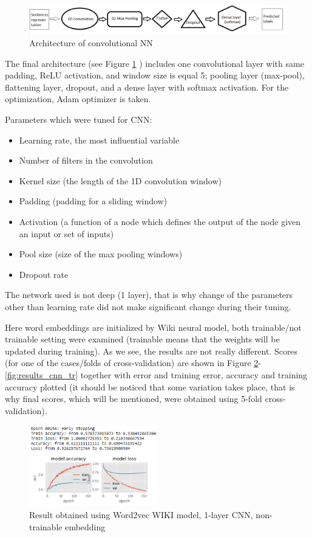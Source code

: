 \documentclass[12pt,a4paper]{article}
\begin{document}
\begin{figure}
\centering
\includegraphics[width=1\textwidth]{figures/cnn_arch.PNG}
\caption{Architecture of convolutional NN}
\label{fig:cnn_arch}
\end{figure}

The final architecture (see Figure \ref{fig:cnn_arch} ) includes one convolutional layer with same padding, ReLU activation, and window size is equal 5; pooling layer (max-pool), flattening layer, dropout, and a dense layer with softmax activation. For the optimization, Adam optimizer is taken. 

Parameters which were tuned for CNN:
\begin{itemize}
\item Learning rate, the most influential variable 
\item Number of filters in the convolution
\item Kernel size (the length of the 1D convolution window)
\item Padding (padding for a sliding window)
\item Activation (a function of a node which defines the output of the node given an input or set of inputs)
\item Pool size (size of the max pooling windows)
\item Dropout rate
\end{itemize}

The network used is not deep (1 layer), that is why change of the parameters other than learning rate did not make significant change during their tuning.

Here word embeddings are initialized by Wiki neural model, both trainable/not trainable setting were examined (trainable means that the weights will be updated during training). As we see, the results are not really different. Scores (for one of the cases/folds of cross-validation) are shown in Figure \ref{fig:results_cnn_nottr}-\ref{fig:results_cnn_tr} together with error and training error, accuracy and training accuracy plotted (it should be noticed that some variation takes place, that is why final scores, which will be mentioned, were obtained using 5-fold cross-validation).

\begin{figure}
\centering
\includegraphics[width=0.5\textwidth]{figures/results_cnn_nottr.PNG}
\caption{Result obtained using Word2vec WIKI model, 1-layer CNN, non-trainable embedding}
\label{fig:results_cnn_nottr}
\end{figure}
\end{document}
